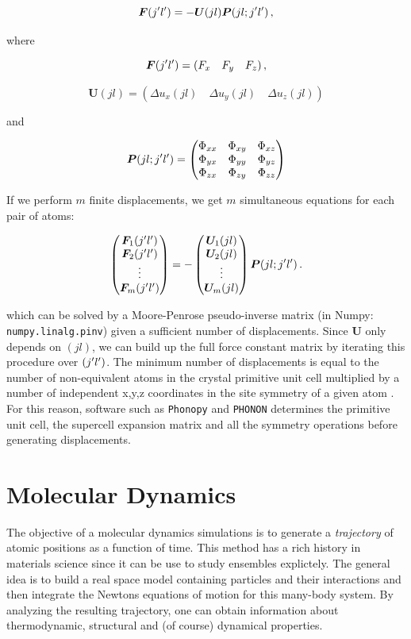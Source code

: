 \[ \bm{F}(j^\prime l^\prime) = -\bm{U}(jl) \bm{P} (jl;j^\prime l^\prime) \, , \]

\noindent where

\[ \bm{F}(j^\prime l^\prime) = (F_x \quad F_y \quad F_z) \, , \]

\[ \bm{U}(jl) = \left( \Delta u_x(jl) \quad \Delta u_y(jl) \quad \Delta u_z(jl) \right)  \]

\noindent and

\[ 
\bm{P} (jl;j^\prime l^\prime) = 	
\begin{pmatrix}
\Phi_{xx} & \Phi_{xy} & \Phi_{xz} \\
\Phi_{yx} & \Phi_{yy} & \Phi_{yz} \\
\Phi_{zx} & \Phi_{zy} & \Phi_{zz} 
\end{pmatrix}
\]

\noindent If we perform $m$ finite displacements, we get $m$ simultaneous equations for each pair of atoms:

\begin{equation*}
\begin{pmatrix} \bm{F}_1(j^\prime l^\prime) \\ \bm{F}_2(j^\prime l^\prime) \\ \vdots \\ \bm{F}_m(j^\prime l^\prime) \end{pmatrix} =
- \begin{pmatrix} \bm{U}_1(jl) \\ \bm{U}_2(jl) \\ \vdots \\ \bm{U}_m(jl) \end{pmatrix} \bm{P}(jl;j^\prime l^\prime) \, .
\end{equation*}

\noindent which can be solved by a Moore-Penrose pseudo-inverse matrix (in Numpy: \texttt{numpy.linalg.pinv}) given a sufficient number of displacements. Since $\bm{U}$ only depends on $(jl)$, we can build up the full force constant matrix by iterating this procedure over $(j^\prime l^\prime)$. The minimum number of displacements is equal to the number of non-equivalent atoms in the crystal primitive unit cell multiplied by a number of independent x,y,z coordinates in the site symmetry of a given atom \cite{Parlinski1997}. For this reason, software such as \texttt{Phonopy} and \texttt{PHONON} determines the primitive unit cell, the supercell expansion matrix and all the symmetry operations before generating displacements.

\section{Molecular Dynamics}\label{sec:method_md}
The objective of a molecular dynamics simulations is to generate a \emph{trajectory} of atomic positions as a function of time. This method has a rich history in materials science since it can be use to study ensembles explictely. The general idea is to build a real space model containing particles and their interactions and then integrate the Newtons equations of motion for this many-body system. By analyzing the resulting trajectory, one can obtain information about thermodynamic, structural and (of course) dynamical properties.

